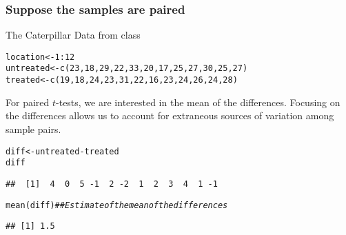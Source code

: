 \documentclass[color=usenames,dvipsnames]{beamer}\usepackage[]{graphicx}\usepackage[]{color}
\makeatletter
\newcommand{\hlnum}[1]{\textcolor[rgb]{0.69,0.494,0}{#1}}%
\newcommand{\hlcom}[1]{\textcolor[rgb]{0.514,0.506,0.514}{\textit{#1}}}%
\newcommand{\hlopt}[1]{\textcolor[rgb]{0,0,0}{#1}}%
\newcommand{\hlstd}[1]{\textcolor[rgb]{0,0,0}{#1}}%
\newcommand{\hlkwb}[1]{\textcolor[rgb]{0,0.341,0.682}{#1}}%
\newcommand{\hlkwd}[1]{\textcolor[rgb]{0.004,0.004,0.506}{#1}}%
\newenvironment{kframe}{%
 \def\at@end@of@kframe{}%
 \ifinner\ifhmode%
  \def\at@end@of@kframe{\end{minipage}}%
  \begin{minipage}{\columnwidth}%
 \fi\fi%
 \def\FrameCommand##1{\hskip\@totalleftmargin \hskip-\fboxsep
 \colorbox{shadecolor}{##1}\hskip-\fboxsep
     \hskip-\linewidth \hskip-\@totalleftmargin \hskip\columnwidth}%
 \MakeFramed {\advance\hsize-\width
   \@totalleftmargin\z@ \linewidth\hsize
   \@setminipage}}%
 {\par\unskip\endMakeFramed%
 \at@end@of@kframe}
\newenvironment{knitrout}{}{} %
\makeatother
\begin{document}
\begin{frame}[fragile]
  \frametitle{Suppose the samples are paired}
  {%
    The Caterpillar Data from class}
\begin{knitrout}
\color{fgcolor}\begin{kframe}
\begin{alltt}
\hlstd{location} \hlkwb{<-} \hlnum{1}\hlopt{:}\hlnum{12}
\hlstd{untreated} \hlkwb{<-} \hlkwd{c}\hlstd{(}\hlnum{23}\hlstd{,}\hlnum{18}\hlstd{,}\hlnum{29}\hlstd{,}\hlnum{22}\hlstd{,}\hlnum{33}\hlstd{,}\hlnum{20}\hlstd{,}\hlnum{17}\hlstd{,}\hlnum{25}\hlstd{,}\hlnum{27}\hlstd{,}\hlnum{30}\hlstd{,}\hlnum{25}\hlstd{,}\hlnum{27}\hlstd{)}
\hlstd{treated} \hlkwb{<-} \hlkwd{c}\hlstd{(}\hlnum{19}\hlstd{,}\hlnum{18}\hlstd{,}\hlnum{24}\hlstd{,}\hlnum{23}\hlstd{,}\hlnum{31}\hlstd{,}\hlnum{22}\hlstd{,}\hlnum{16}\hlstd{,}\hlnum{23}\hlstd{,}\hlnum{24}\hlstd{,}\hlnum{26}\hlstd{,}\hlnum{24}\hlstd{,}\hlnum{28}\hlstd{)}
\end{alltt}
\end{kframe}
\end{knitrout}
  \pause
  \vfill
  {%
    For paired $t$-tests, we are interested in the \alert{mean of the 
    differences}. Focusing on the differences allows us to account for
    extraneous sources of variation among sample pairs.}
  \vfill
  \pause
\begin{knitrout}
\color{fgcolor}\begin{kframe}
\begin{alltt}
\hlstd{diff} \hlkwb{<-} \hlstd{untreated}\hlopt{-}\hlstd{treated}
\hlstd{diff}
\end{alltt}
\begin{verbatim}
##  [1]  4  0  5 -1  2 -2  1  2  3  4  1 -1
\end{verbatim}
\begin{alltt}
\hlkwd{mean}\hlstd{(diff)} \hlcom{## Estimate of the mean of the differences}
\end{alltt}
\begin{verbatim}
## [1] 1.5
\end{verbatim}
\end{kframe}
\end{knitrout}

\end{frame}



\end{document}

